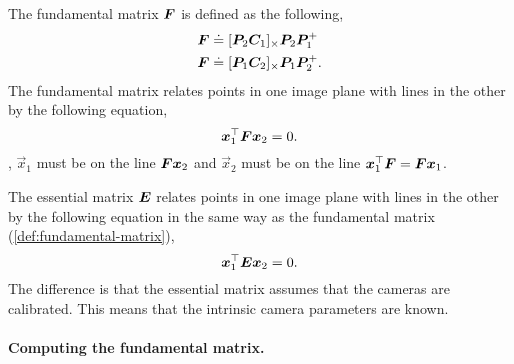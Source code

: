 
\begin{definition}
  \label{def:fundamental-matrix}

  The fundamental matrix $\bm{F}$ is defined as the following,
  \begin{align*}
    \bm{F} &\doteq [\bm{P}_2 \bm{C}_1]_\times \bm{P}_2 \bm{P}_1^+ \\
    \bm{F} &\doteq [\bm{P}_1 \bm{C}_2]_\times \bm{P}_1 \bm{P}_2^+
  .\end{align*}
  The fundamental matrix relates points in one image plane with lines in the
  other by the following equation, \[
    \bm{x}_1^\top \bm{F} \bm{x}_2 = 0
  .\]
  \Ie, $\vec{x}_1$ must be on the line $\bm{F} \bm{x}_2$ and $\vec{x}_2$
  must be on the line $\bm{x}_1^\top \bm{F} = \bm{F} \bm{x}_1$.
\end{definition}

\begin{definition}
  The essential matrix $\bm{E}$ relates points in one image plane with lines
  in the other by the following equation in the same way as the fundamental
  matrix (\cref{def:fundamental-matrix}), \[
    \bm{x}_1^\top \bm{E} \bm{x}_2 = 0
  .\]
  The difference is that the essential matrix assumes that the cameras are
  calibrated. This means that the intrinsic camera parameters are known.
\end{definition}

\paragraph{Computing the fundamental matrix.}

